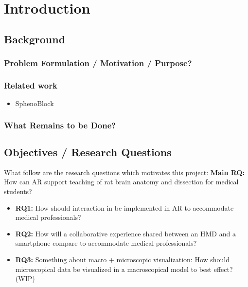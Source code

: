 \chapter{Introduction}

\section{Background}

\subsection*{Problem Formulation / Motivation / Purpose?}


\subsection*{Related work}

{
    \color{BrickRed}
    \begin{itemize}
        \item SphenoBlock

    \end{itemize}
}

\subsection*{What Remains to be Done?}

\section{Objectives / Research Questions}
What follow are the research questions which motivates this project: 
\noindent
\textbf{Main RQ:} How can AR support teaching of rat brain anatomy and dissection for medical students?
\begin{itemize}
    \item {
        \textbf{RQ1:} How should interaction in be implemented in AR to accommodate medical professionals?
    }
    \item {
        \textbf{RQ2:} How will a collaborative experience shared between an HMD and a smartphone compare to accommodate medical professionals?
    }
    \item {
        \color{BrickRed}
        \textbf{RQ3: }
        Something about macro + microscopic visualization:
        How should microscopical data be visualized in a macroscopical model to best effect? (WIP)
    }
\end{itemize}


